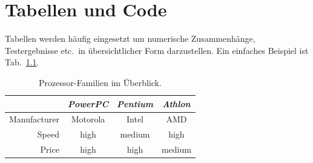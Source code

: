 \chapter{Tabellen und Code}
Tabellen werden häufig eingesetzt um numerische Zusammenhänge, Testergebnisse
etc.\ in übersichtlicher Form darzustellen. Ein einfaches Beispiel ist Tab.~\ref{tab:processors}.

\begin{table}
	\caption{Prozessor-Familien im Überblick.}
	\label{tab:processors}
	\centering
	\setlength{\tabcolsep}{5mm}	%
	\def\arraystretch{1.25}			%
	\begin{tabular}{|r||c|c|c|} \hline
		& \emph{PowerPC} & \emph{Pentium} & \emph{Athlon} \\
		\hline\hline
		Manufacturer & Motorola & Intel & AMD \\
		\hline
		Speed & high & medium & high   \\
		\hline
		Price & high & high   & medium \\
		\hline
	\end{tabular}
\end{table}

